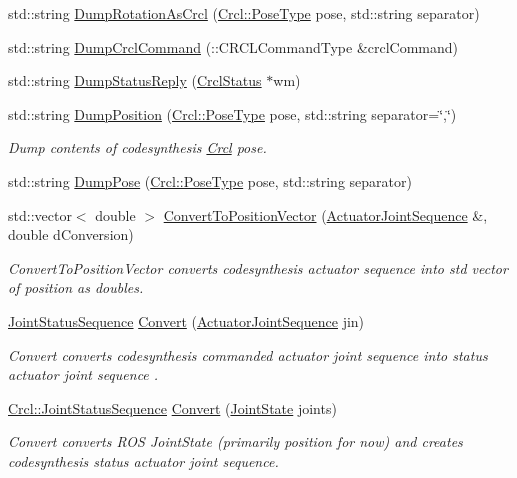 \begin{DoxyCompactItemize}
std\-::string \hyperlink{namespaceCrcl_a6f1cb883f1831e5f4be05f3d111545fd}{Dump\-Rotation\-As\-Crcl} (\hyperlink{namespaceCrcl_acc6c82b52280f4d0e74b82a92400956e}{Crcl\-::\-Pose\-Type} pose, std\-::string separator)
\item 
std\-::string \hyperlink{namespaceCrcl_a1726015b66be8193fcd10bc157661a3d}{Dump\-Crcl\-Command} (\-::C\-R\-C\-L\-Command\-Type \&crcl\-Command)
\item 
std\-::string \hyperlink{namespaceCrcl_af7bfef1ba7b0d1fa2ea0033ef391d254}{Dump\-Status\-Reply} (\hyperlink{structCrcl_1_1CrclStatus}{Crcl\-Status} $\ast$wm)
\item 
std\-::string \hyperlink{namespaceCrcl_a7ffbb8bbe0b97bcd6fc145b52eba1c6e}{Dump\-Position} (\hyperlink{namespaceCrcl_acc6c82b52280f4d0e74b82a92400956e}{Crcl\-::\-Pose\-Type} pose, std\-::string separator=\char`\"{},\char`\"{})
\begin{DoxyCompactList}\small\item\em Dump contents of codesynthesis \hyperlink{namespaceCrcl}{Crcl} pose. \end{DoxyCompactList}\item 
std\-::string \hyperlink{namespaceCrcl_a666314177998417d741895bb491783bd}{Dump\-Pose} (\hyperlink{namespaceCrcl_acc6c82b52280f4d0e74b82a92400956e}{Crcl\-::\-Pose\-Type} pose, std\-::string separator)
\item 
std\-::vector$<$ double $>$ \hyperlink{namespaceCrcl_af6bec848a13c03669ca8920795c5d3ad}{Convert\-To\-Position\-Vector} (\hyperlink{namespaceCrcl_af084766e8e2d38a135cc67ef54d9904d}{Actuator\-Joint\-Sequence} \&, double d\-Conversion)
\begin{DoxyCompactList}\small\item\em Convert\-To\-Position\-Vector converts codesynthesis actuator sequence into std vector of position as doubles. \end{DoxyCompactList}\item 
\hyperlink{namespaceCrcl_a8e2d423195eeffb85b45b63f595f2825}{Joint\-Status\-Sequence} \hyperlink{namespaceCrcl_a329b70844c080b1a81c89989b58ffbd5}{Convert} (\hyperlink{namespaceCrcl_af084766e8e2d38a135cc67ef54d9904d}{Actuator\-Joint\-Sequence} jin)
\begin{DoxyCompactList}\small\item\em Convert converts codesynthesis commanded actuator joint sequence into status actuator joint sequence . \end{DoxyCompactList}\item 
\hyperlink{namespaceCrcl_a8e2d423195eeffb85b45b63f595f2825}{Crcl\-::\-Joint\-Status\-Sequence} \hyperlink{namespaceCrcl_a1f43fba61abba477ee664c4b5c6dd65b}{Convert} (\hyperlink{RCS_8h_aa4adb93a26caa4dacba9c9614e283245}{Joint\-State} joints)
\begin{DoxyCompactList}\small\item\em Convert converts R\-O\-S Joint\-State (primarily position for now) and creates codesynthesis status actuator joint sequence. \end{DoxyCompactList}\end{DoxyCompactItemize}
